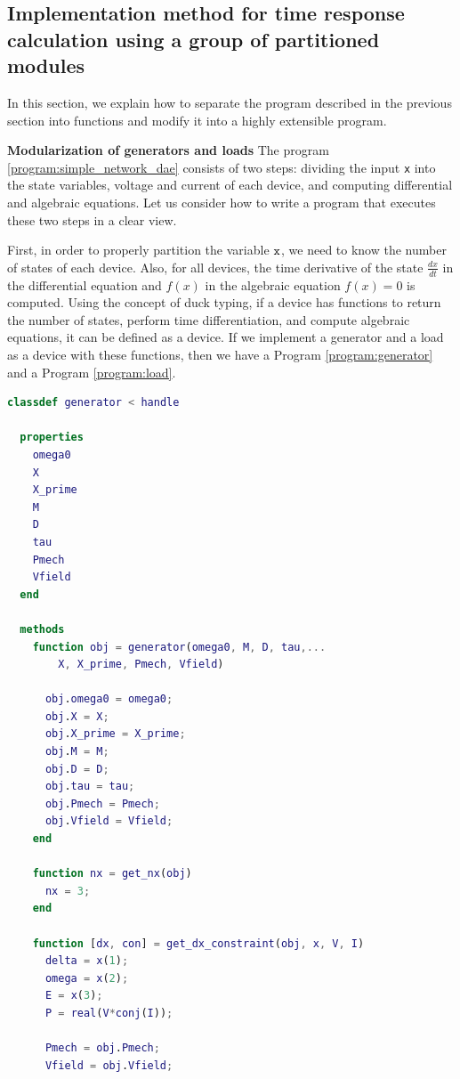 \documentclass[graybox, envcountchap]{svmult}
\begin{document}
\subsection{Implementation method for time response calculation using a group of partitioned modules}
In this section, we explain how to separate the program described in the
previous section into functions and modify it into a highly extensible program.

\begin{example}{\textbf{Modularization of generators and loads}}\label{ex:gen_load}
  The program \nobreak\ref{program:simple_network_dae} consists of two steps:
  dividing the input \verb|x| into the state variables, voltage and current of
  each device, and computing differential and algebraic equations. Let us
  consider how to write a program that executes these two steps in a clear view.
 
  First, in order to properly partition the variable $\verb|x|$, we need to know
  the number of states of each device. Also, for all devices, the time
  derivative of the state $\tfrac{dx}{dt}$ in the differential equation and
  $f(x)$ in the algebraic equation $f(x)=0$ is computed. Using the concept of
  duck typing, if a device has functions to return the number of states, perform
  time differentiation, and compute algebraic equations, it can be defined as a
  device. If we implement a generator and a load as a device with these
  functions, then we have a Program \nobreak\ref{program:generator} and a
  Program \ref{program:load}.


\begin{lstlisting}[language=Matlab, caption=generator.m, label={program:generator}]
classdef generator < handle
    
  properties
    omega0
    X
    X_prime
    M
    D
    tau
    Pmech
    Vfield
  end

  methods
    function obj = generator(omega0, M, D, tau,...
        X, X_prime, Pmech, Vfield)

      obj.omega0 = omega0;
      obj.X = X;
      obj.X_prime = X_prime;
      obj.M = M;
      obj.D = D;
      obj.tau = tau;
      obj.Pmech = Pmech;
      obj.Vfield = Vfield;
    end

    function nx = get_nx(obj)
      nx = 3;
    end

    function [dx, con] = get_dx_constraint(obj, x, V, I)
      delta = x(1);
      omega = x(2);
      E = x(3);
      P = real(V*conj(I));

      Pmech = obj.Pmech;
      Vfield = obj.Vfield;


\end{lstlisting}
\end{example}
\end{document}
